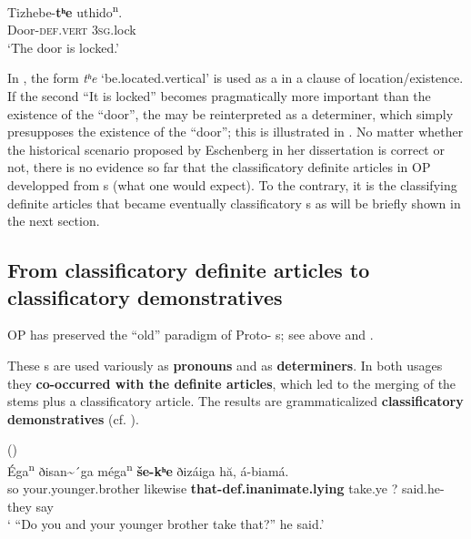 \documentclass[output=paper]{langsci/langscibook}
\begin{document}
\ea \label{ex:helmbrecht:22}
\gll Tizhebe-\textbf{tʰe}                    uthido\textsuperscript{n}.\\
    Door-\textsc{def}.\textsc{vert}      \textsc{3sg}.lock\\
\glt    ‘The door is locked.’ \citep[189]{Eschenberg2005}
\z

In , the form \textit{tʰe} `be.located.vertical' is used as a  in a clause of location\slash existence. If the second  ``It is locked'' becomes pragmatically more important than the existence of the ``door'', the  may be reinterpreted as a determiner, which simply presupposes the existence of the ``door''; this is illustrated in . No matter whether the historical scenario proposed by Eschenberg in her dissertation is correct or not, there is no evidence so far that the classificatory definite articles in OP developped from s (what one would expect). To the contrary, it is the classifying definite articles that became eventually classificatory s as will be briefly shown in the next section. 

\subsection{{From classificatory definite articles to classificatory demonstratives}}\label{sec:helmbrecht:6.2}

OP has preserved the ``old'' paradigm of Proto- s; see  above and .


These s are used variously as \textbf{ pronouns} and as \textbf{determiners}. In both usages they \textbf{co-occurred with the definite articles}, which led to the merging of the  stems plus a classificatory article. The results are grammaticalized \textbf{classificatory demonstratives} (cf. \citealt[215]{Rankin2004b}).

\ea  \label{ex:helmbrecht:23}
 (\citealt[26/27]{Dorsey1890})\\
\gll  Éga\textsuperscript{n} ðisan{\textasciitilde}´ga    méga\textsuperscript{n} \textbf{še-kʰe} ðizáiga  hă,  á-biamá.\\
    so      your.younger.brother likewise  \textbf{that-def.inanimate.lying}    take.ye  ?     said.he-they say\\
\glt     ` ``Do you and your younger brother take that?'' he said.'
    \z
\end{document}
